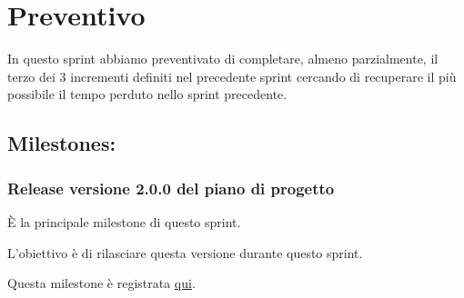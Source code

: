 \section{Preventivo}

In questo sprint abbiamo preventivato di completare, almeno parzialmente, il terzo dei 3 incrementi definiti nel precedente sprint cercando di recuperare il più possibile il tempo perduto nello sprint precedente.

\subsection{Milestones:}  

\subsubsection{Release versione 2.0.0 del piano di progetto}

È la principale milestone di questo sprint.

L'obiettivo è di rilasciare questa versione durante questo sprint.

Questa milestone è registrata \href{https://github.com/SWEasabi/piano-di-progetto/milestone/2}{qui}.